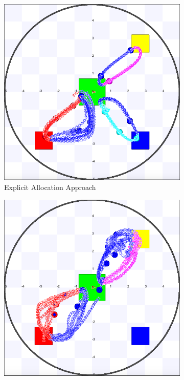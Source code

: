 \documentclass[letterpaper, 10 pt, conference]{ieeeconf}  %
\begin{document}
\begin{figure}[H]
  \begin{subfigure}{.25\textwidth}
      \includegraphics[width=0.9\linewidth]{images/explicit/3/raw/16.png}
         \centering
         \caption{Explicit Allocation Approach}
   \end{subfigure}%
     \begin{subfigure}{.25\textwidth}
       \includegraphics[width=0.9\linewidth]{images/embodied/3/raw/16.png}

\end{subfigure}
\end{figure}
\end{document}
